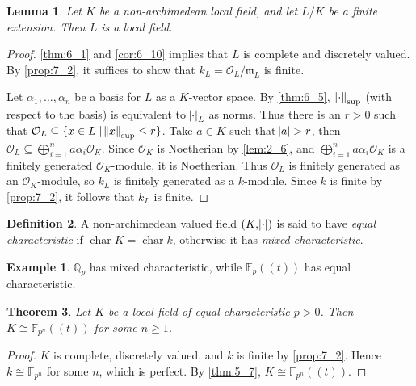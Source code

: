 \documentclass[11pt]{article}
\theoremstyle{definition}
\newtheorem{definition}{Definition}[subsection]
\newtheorem*{example}{Example}
\theoremstyle{plain}
\newtheorem{theorem}[definition]{Theorem}
\newtheorem{lemma}[definition]{Lemma}
\theoremstyle{remark}
\DeclareMathOperator{\Char}{char}
\newcommand{\bF}{\mathbb{F}}
\newcommand{\bQ}{\mathbb{Q}}
\newcommand{\cO}{\mathcal{O}}
\newcommand{\fm}{\mathfrak{m}}
\begin{document}
\begin{lemma}\label{lem:7_5}
    Let $K$ be a non-archimedean local field, and let $L/K$ be a finite extension. Then $L$ is a local field.
\end{lemma}
\begin{proof}
    \autoref{thm:6_1} and \autoref{cor:6_10} implies that $L$ is complete and discretely valued. By \autoref{prop:7_2}, it suffices to show that $k_L = \cO_L / \fm_L$ is finite.

    Let $\alpha_1, \ldots, \alpha_n$ be a basis for $L$ as a $K$-vector space. By \autoref{thm:6_5}, $\norm{\cdot}_\mathrm{sup}$ (with respect to the basis) is equivalent to $\abs{\cdot}_L$ as norms. Thus there is an $r > 0$ such that $\cO_L \subseteq \{x \in L \mid \norm{x}_\mathrm{sup} \le r\}$. Take $a \in K$ such that $\abs{a} > r$, then $\cO_L \subseteq \bigoplus_{i=1}^n a \alpha_i \cO_K$. Since $\cO_K$ is Noetherian by \autoref{lem:2_6}, and $\bigoplus_{i=1}^n a \alpha_i \cO_K$ is a finitely generated $\cO_K$-module, it is Noetherian. Thus $\cO_L$ is finitely generated as an $\cO_K$-module, so $k_L$ is finitely generated as a $k$-module. Since $k$ is finite by \autoref{prop:7_2}, it follows that $k_L$ is finite.
\end{proof}


\begin{definition}
    A non-archimedean valued field $(K, \abs{\cdot})$ is said to have \emph{equal characteristic} if $\Char{K} = \Char{k}$, otherwise it has \emph{mixed characteristic}.
\end{definition}

\begin{example}
    $\bQ_p$ has mixed characteristic, while $\bF_p((t))$ has equal characteristic.
\end{example}

\begin{theorem}\label{thm:7_8}
    Let $K$ be a local field of equal characteristic $p > 0$. Then $K \cong \bF_{p^n}((t))$ for some $n \ge 1$.
\end{theorem}
\begin{proof}
    $K$ is complete, discretely valued, and $k$ is finite by \autoref{prop:7_2}. Hence $k \cong \bF_{p^n}$ for some $n$, which is perfect. By \autoref{thm:5_7}, $K \cong \bF_{p^n}((t))$.
\end{proof}
\end{document}

